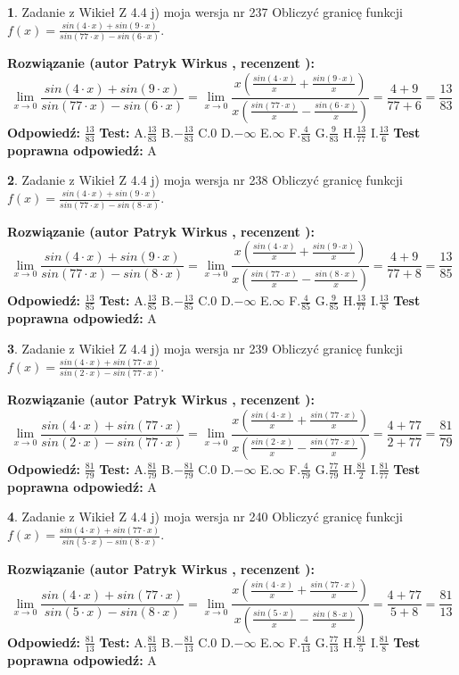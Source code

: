 \documentclass[12pt, a4paper]{article}
\theoremstyle{definition} %
\newtheorem{zad}{}
\newcommand{\zadStart}[1]{\begin{zad}#1\newline}
\newcommand{\zadStop}{\end{zad}}
\newcommand{\rozwStart}[2]{\noindent \textbf{Rozwiązanie (autor #1 , recenzent #2): }\newline}
\newcommand{\rozwStop}{\newline}
\newcommand{\odpStart}{\noindent \textbf{Odpowiedź:}\newline}
\newcommand{\odpStop}{\newline}
\newcommand{\testStart}{\noindent \textbf{Test:}\newline}
\newcommand{\testStop}{\newline}
\newcommand{\kluczStart}{\noindent \textbf{Test poprawna odpowiedź:}\newline}
\newcommand{\kluczStop}{\newline}
\begin{document}
\zadStart{Zadanie z Wikieł Z 4.4 j) moja wersja nr 237}
Obliczyć granicę funkcji $f(x)=\frac{sin(4\cdot x) +sin(9\cdot x)}{sin(77\cdot x) -sin(6\cdot x)}$.
\zadStop
\rozwStart{Patryk Wirkus}{}
$$\lim\limits_{x\to 0}\frac{sin(4\cdot x) +sin(9\cdot x)}{sin(77\cdot x) -sin(6\cdot x)}=\lim\limits_{x\to 0}\frac{x(\frac{sin(4\cdot x)}{x}+\frac{sin(9\cdot x)}{x})}{x(\frac{sin(77\cdot x)}{x}-\frac{sin(6\cdot x)}{x})}=\frac{4+9}{77+6} = \frac{13}{83}$$
\rozwStop
\odpStart
$\frac{13}{83}$
\odpStop
\testStart
A.$\frac{13}{83}$
B.$-\frac{13}{83}$
C.$0$
D.$-\infty$
E.$\infty$
F.$\frac{4}{83}$
G.$\frac{9}{83}$
H.$\frac{13}{77}$
I.$\frac{13}{6}$
\testStop
\kluczStart
A
\kluczStop



\zadStart{Zadanie z Wikieł Z 4.4 j) moja wersja nr 238}
Obliczyć granicę funkcji $f(x)=\frac{sin(4\cdot x) +sin(9\cdot x)}{sin(77\cdot x) -sin(8\cdot x)}$.
\zadStop
\rozwStart{Patryk Wirkus}{}
$$\lim\limits_{x\to 0}\frac{sin(4\cdot x) +sin(9\cdot x)}{sin(77\cdot x) -sin(8\cdot x)}=\lim\limits_{x\to 0}\frac{x(\frac{sin(4\cdot x)}{x}+\frac{sin(9\cdot x)}{x})}{x(\frac{sin(77\cdot x)}{x}-\frac{sin(8\cdot x)}{x})}=\frac{4+9}{77+8} = \frac{13}{85}$$
\rozwStop
\odpStart
$\frac{13}{85}$
\odpStop
\testStart
A.$\frac{13}{85}$
B.$-\frac{13}{85}$
C.$0$
D.$-\infty$
E.$\infty$
F.$\frac{4}{85}$
G.$\frac{9}{85}$
H.$\frac{13}{77}$
I.$\frac{13}{8}$
\testStop
\kluczStart
A
\kluczStop



\zadStart{Zadanie z Wikieł Z 4.4 j) moja wersja nr 239}
Obliczyć granicę funkcji $f(x)=\frac{sin(4\cdot x) +sin(77\cdot x)}{sin(2\cdot x) -sin(77\cdot x)}$.
\zadStop
\rozwStart{Patryk Wirkus}{}
$$\lim\limits_{x\to 0}\frac{sin(4\cdot x) +sin(77\cdot x)}{sin(2\cdot x) -sin(77\cdot x)}=\lim\limits_{x\to 0}\frac{x(\frac{sin(4\cdot x)}{x}+\frac{sin(77\cdot x)}{x})}{x(\frac{sin(2\cdot x)}{x}-\frac{sin(77\cdot x)}{x})}=\frac{4+77}{2+77} = \frac{81}{79}$$
\rozwStop
\odpStart
$\frac{81}{79}$
\odpStop
\testStart
A.$\frac{81}{79}$
B.$-\frac{81}{79}$
C.$0$
D.$-\infty$
E.$\infty$
F.$\frac{4}{79}$
G.$\frac{77}{79}$
H.$\frac{81}{2}$
I.$\frac{81}{77}$
\testStop
\kluczStart
A
\kluczStop



\zadStart{Zadanie z Wikieł Z 4.4 j) moja wersja nr 240}
Obliczyć granicę funkcji $f(x)=\frac{sin(4\cdot x) +sin(77\cdot x)}{sin(5\cdot x) -sin(8\cdot x)}$.
\zadStop
\rozwStart{Patryk Wirkus}{}
$$\lim\limits_{x\to 0}\frac{sin(4\cdot x) +sin(77\cdot x)}{sin(5\cdot x) -sin(8\cdot x)}=\lim\limits_{x\to 0}\frac{x(\frac{sin(4\cdot x)}{x}+\frac{sin(77\cdot x)}{x})}{x(\frac{sin(5\cdot x)}{x}-\frac{sin(8\cdot x)}{x})}=\frac{4+77}{5+8} = \frac{81}{13}$$
\rozwStop
\odpStart
$\frac{81}{13}$
\odpStop
\testStart
A.$\frac{81}{13}$
B.$-\frac{81}{13}$
C.$0$
D.$-\infty$
E.$\infty$
F.$\frac{4}{13}$
G.$\frac{77}{13}$
H.$\frac{81}{5}$
I.$\frac{81}{8}$
\testStop
\kluczStart
A
\kluczStop
\end{document}
